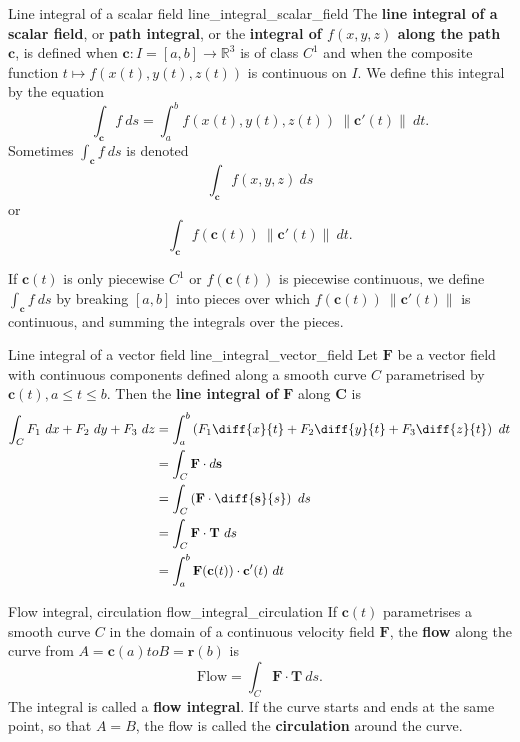 \begin{definition}{Line integral of a scalar field \cite{marsden_vector_calculus}}{line_integral_scalar_field}
The \textbf{line integral of a scalar field}, or \textbf{path integral}, or the \textbf{integral of $f(x, y, z)$ along the path $\mathbf{c}$}, is defined when $\mathbf{c}: I = [a, b] \to \mathbb{R}^3$ is of class $C^1$ and when the composite function $t \mapsto f(x(t), y(t), z(t))$ is continuous on $I$. We define this integral by the equation
$$ \int_{\mathbf{c}} f \ ds = \int_a^b f(x(t), y(t), z(t)) \ \lVert \mathbf{c}'(t) \rVert \ dt . $$
Sometimes $\int_\mathbf{c} f \ ds$ is denoted
$$ \int_\mathbf{c} f(x, y, z) \ ds $$
or
$$ \int_\mathbf{c} f(\mathbf{c}(t)) \ \lVert \mathbf{c}'(t) \rVert \ dt . $$

If $\mathbf{c}(t)$ is only piecewise $C^1$ or $f(\mathbf{c}(t))$ is piecewise continuous, we define $\int_\mathbf{c} f \ ds$ by breaking $[a, b]$ into pieces over which $f(\mathbf{c}(t)) \ \lVert \mathbf{c}'(t) \rVert$ is continuous, and summing the integrals over the pieces.
\end{definition}

\begin{definition}{Line integral of a vector field \cite{thomas_calculus}}{line_integral_vector_field}
Let $\mathbf{F}$ be a vector field with continuous components defined along a smooth curve $C$ parametrised by $\mathbf{c}(t), a \leq t \leq b$. Then the \textbf{line integral of} $\mathbf{F}$ along $\mathbf{C}$ is
\begin{align*}
\int_C F_1 \ dx + F_2 \ dy + F_3 \ dz &= \int_a^b \left( F_1 \diff{x}{t} + F_2 \diff{y}{t} + F_3 \diff{z}{t} \right) \ dt \\
&= \int_C \mathbf{F} \cdot d \mathbf{s} \\
&= \int_C \left( \mathbf{F} \cdot \diff{\mathbf{s}}{s} \right) \ ds \\
&= \int_C \mathbf{F} \cdot \mathbf{T} \ ds \\
&= \int_a^b \mathbf{F}(\mathbf{c}(t)) \cdot \mathbf{c}'(t) \ dt
\end{align*}
\end{definition}

\begin{definition}{Flow integral, circulation \cite{thomas_calculus}}{flow_integral_circulation}
If $\mathbf{c}(t)$ parametrises a smooth curve $C$ in the domain of a continuous velocity field $\mathbf{F}$, the \textbf{flow} along the curve from $A = \mathbf{c}(a) to B = \mathbf{r}(b)$ is
$$ \text{Flow} = \int_C \mathbf{F} \cdot \mathbf{T} \ ds . $$
The integral is called a \textbf{flow integral}. If the curve starts and ends at the same point, so that $A = B$, the flow is called the \textbf{circulation} around the curve.
\end{definition}

